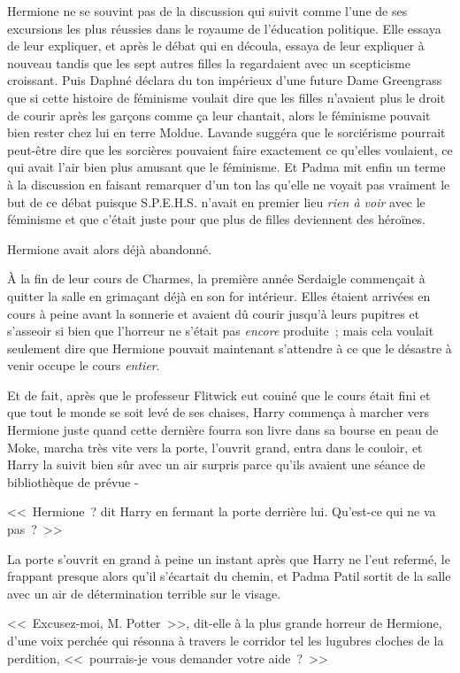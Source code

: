 Hermione ne se souvint pas de la discussion qui suivit comme l'une de ses excursions les plus réussies dans le royaume de l'éducation politique. Elle essaya de leur expliquer, et après le débat qui en découla, essaya de leur expliquer à nouveau tandis que les sept autres filles la regardaient avec un scepticisme croissant. Puis Daphné déclara du ton impérieux d'une future Dame Greengrass que si cette histoire de féminisme voulait dire que les filles n'avaient plus le droit de courir après les garçons comme ça leur chantait, alors le féminisme pouvait bien rester chez lui en terre Moldue. Lavande suggéra que le sorciérisme pourrait peut-être dire que les sorcières pouvaient faire exactement ce qu'elles voulaient, ce qui avait l'air bien plus amusant que le féminisme. Et Padma mit enfin un terme à la discussion en faisant remarquer d'un ton las qu'elle ne voyait pas vraiment le but de ce débat puisque S.P.E.H.S. n'avait en premier lieu \emph{rien à voir} avec le féminisme et que c'était juste pour que plus de filles deviennent des héroïnes.

Hermione avait alors déjà abandonné.

\later

À la fin de leur cours de Charmes, la première année Serdaigle commençait à quitter la salle en grimaçant déjà en son for intérieur. Elles étaient arrivées en cours à peine avant la sonnerie et avaient dû courir jusqu'à leurs pupitres et s'asseoir si bien que l'horreur ne s'était pas \emph{encore} produite~; mais cela voulait seulement dire que Hermione pouvait maintenant s'attendre à ce que le désastre à venir occupe le cours \emph{entier}.

Et de fait, après que le professeur Flitwick eut couiné que le cours était fini et que tout le monde se soit levé de ses chaises, Harry commença à marcher vers Hermione juste quand cette dernière fourra son livre dans sa bourse en peau de Moke, marcha très vite vers la porte, l'ouvrit grand, entra dans le couloir, et Harry la suivit bien sûr avec un air surpris parce qu'ils avaient une séance de bibliothèque de prévue -

<<~Hermione~? dit Harry en fermant la porte derrière lui. Qu'est-ce qui ne va pas~?~>>

La porte s'ouvrit en grand à peine un instant après que Harry ne l'eut refermé, le frappant presque alors qu'il s'écartait du chemin, et Padma Patil sortit de la salle avec un air de détermination terrible sur le visage.

<<~Excusez-moi, M. Potter~>>, dit-elle à la plus grande horreur de Hermione, d'une voix perchée qui résonna à travers le corridor tel les lugubres cloches de la perdition, <<~pourrais-je vous demander votre aide~?~>>

